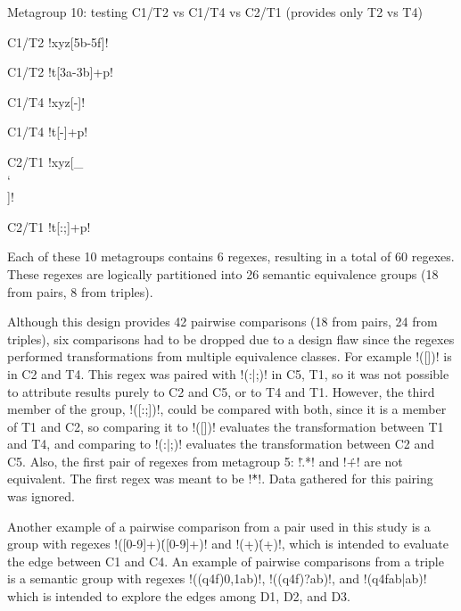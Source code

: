 \vspace{-2mm}
Metagroup 10: testing C1/T2 vs C1/T4 vs C2/T1 (provides only T2 vs T4)
\vspace{-5mm}
\begin{multicols}{3}
\begin{itemize}[noitemsep,topsep=0pt]
\begin{small}
\item[C1/T2] \cverb!xyz[\x5b-\x5f]!
\item[C1/T2] \cverb!t[\x3a-\x3b]+p!
\item[C1/T4] \cverb!xyz[-]!
\item[C1/T4] \cverb!t[-]+p!
\item[C2/T1] \cverb!xyz[_\[\]`\^\\]!
\item[C2/T1] \cverb!t[:;]+p!
\end{small}
\end{itemize}
\end{multicols}

Each of these 10 metagroups contains 6 regexes, resulting in a total of 60 regexes.  These regexes are logically partitioned into 26 semantic equivalence groups (18 from pairs, 8 from triples).

Although this design provides 42 pairwise comparisons (18 from pairs, 24 from triples),  six comparisons had to be dropped due to a design flaw since the regexes performed transformations from multiple equivalence classes. For example \cverb!([])! is in C2 and T4.  This regex was paired with \cverb!(:|;)! in C5, T1, so it was not possible to attribute results purely to C2 and C5, or to T4 and T1. However, the third member of the group, \cverb!([:;])!, could be compared with both, since it is a member of T1 and C2, so comparing it to \cverb!([])! evaluates the transformation between T1 and T4, and comparing to \cverb!(:|;)! evaluates the transformation between C2 and C5.  Also, the first pair of regexes from metagroup 5: \cverb!\..*! and \cverb!\.+! are not equivalent.  The first regex was meant to be \cverb!\.\.*!.  Data gathered for this pairing was ignored.

Another example of a pairwise comparison from a pair used in this study is a group with regexes \cverb!([0-9]+)\.([0-9]+)! and  \cverb!(\d+)\.(\d+)!, which is intended to evaluate the edge between C1 and C4.
An example of pairwise comparisons from a triple is a semantic group with regexes \cverb!((q4f){0,1}ab)!, \cverb!((q4f)?ab)!, and \cverb!(q4fab|ab)! which is intended to explore the edges among D1, D2, and D3.


